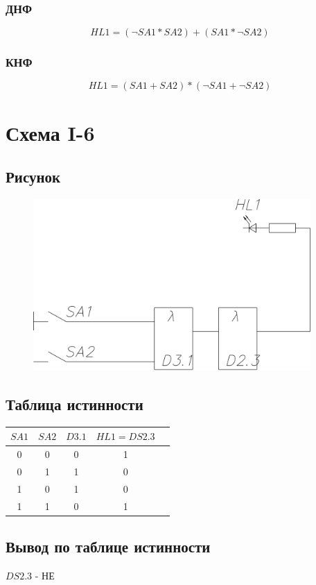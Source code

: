\documentclass[a4paper]{article}
\begin{document}
\subsubsection{ДНФ}
$$ HL1 = (\neg SA1 * SA2) + (SA1 * \neg SA2)$$
\subsubsection{КНФ}
$$ HL1 = (SA1 + SA2)*(\neg SA1 + \neg SA2)$$

\pagebreak


\section{Схема I-6}
\subsection{Рисунок}
\begin{figure}[H]
    \centering
    \includegraphics[width=300pt]{6.png}
\end{figure}
\subsection{Таблица истинности}
\begin{table}[H]
    \centering
    \begin{tabular}{|c|c|c|c|c|}
        \hline
        $SA1$ & $SA2$ & $D3.1$ & $HL1 = DS2.3$ \\
        \hline
        0 & 0 & 0 & 1 \\
        0 & 1 & 1 & 0 \\
        1 & 0 & 1 & 0 \\
        1 & 1 & 0 & 1 \\
        \hline
    \end{tabular}
\end{table}

\subsection{Вывод по таблице истинности}
$DS2.3$ - НЕ
\end{document}

